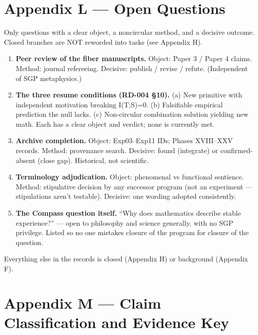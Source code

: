 \documentclass[
  11pt,
]{book}
\providecommand{\tightlist}{%
  \setlength{\itemsep}{0pt}\setlength{\parskip}{0pt}}
\begin{document}
\newpage

\chapter{Appendix L --- Open Questions}\label{appendix-l-open-questions}

Only questions with a clear object, a noncircular method, and a decisive
outcome. Closed branches are NOT reworded into tasks (see Appendix H).

\begin{enumerate}
\def\labelenumi{\arabic{enumi}.}
\tightlist
\item
  \textbf{Peer review of the fiber manuscripts.} Object: Paper 3 / Paper
  4 claims. Method: journal refereeing. Decisive: publish / revise /
  refute. (Independent of SGP metaphysics.)
\item
  \textbf{The three resume conditions (RD-004 §10).} (a) New primitive
  with independent motivation breaking I(T;S)=0. (b) Falsifiable
  empirical prediction the null lacks. (c) Non-circular combination
  solution yielding new math. Each has a clear object and verdict; none
  is currently met.
\item
  \textbf{Archive completion.} Object: Exp03--Exp11 IDs; Phases
  XVIII--XXV records. Method: provenance search. Decisive: found
  (integrate) or confirmed-absent (close gap). Historical, not
  scientific.
\item
  \textbf{Terminology adjudication.} Object: phenomenal vs functional
  sentience. Method: stipulative decision by any successor program (not
  an experiment --- stipulations aren't testable). Decisive: one wording
  adopted consistently.
\item
  \textbf{The Compass question itself.} ``Why does mathematics describe
  stable experience?'' --- open to philosophy and science generally,
  with no SGP privilege. Listed so no one mistakes closure of the
  program for closure of the question.
\end{enumerate}

Everything else in the records is closed (Appendix H) or background
(Appendix F).

\newpage

\chapter{Appendix M --- Claim Classification and Evidence
Key}\label{appendix-m-claim-classification-and-evidence-key}
\end{document}
